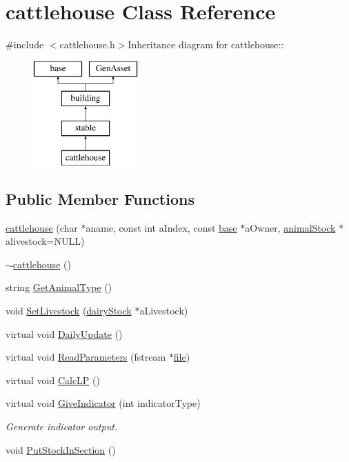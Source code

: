 \hypertarget{classcattlehouse}{
\section{cattlehouse Class Reference}
\label{classcattlehouse}
}


{\ttfamily \#include $<$cattlehouse.h$>$}Inheritance diagram for cattlehouse::\begin{figure}[H]
\begin{center}
\leavevmode
\includegraphics[height=4cm]{classcattlehouse}
\end{center}
\end{figure}
\subsection*{Public Member Functions}
\begin{DoxyCompactItemize}
\item 
\hyperlink{classcattlehouse_afdd153b139a38dfbac4dfdb3fd558e73}{cattlehouse} (char $\ast$aname, const int aIndex, const \hyperlink{classbase}{base} $\ast$aOwner, \hyperlink{classanimal_stock}{animalStock} $\ast$alivestock=NULL)
\item 
\hyperlink{classcattlehouse_aae784075e2e6f6518603cb85d0440d6a}{$\sim$cattlehouse} ()
\item 
string \hyperlink{classcattlehouse_ab4c837c538894c34c19d7a1cf23ce09f}{GetAnimalType} ()
\item 
void \hyperlink{classcattlehouse_ac9e26b19cc9e27590857650922c928a7}{SetLivestock} (\hyperlink{classdairy_stock}{dairyStock} $\ast$aLivestock)
\item 
virtual void \hyperlink{classcattlehouse_a75cd328a6b1b07b2eb49be0048ac889d}{DailyUpdate} ()
\item 
virtual void \hyperlink{classcattlehouse_a113f5bf0d97865c9872c0c4efd073861}{ReadParameters} (fstream $\ast$\hyperlink{classbase_a3af52ee9891719d09b8b19b42450b6f6}{file})
\item 
virtual void \hyperlink{classcattlehouse_a7806fd8778ff33751dcb81e06a01471e}{CalcLP} ()
\item 
virtual void \hyperlink{classcattlehouse_ab71be5e3ab86351671ae24119ec62bd4}{GiveIndicator} (int indicatorType)
\begin{DoxyCompactList}\small\item\em Generate indicator output. \item\end{DoxyCompactList}\item 
void \hyperlink{classcattlehouse_ad36720d676b62f2e8705994e70e0daf3}{PutStockInSection} ()
\end{DoxyCompactItemize}


